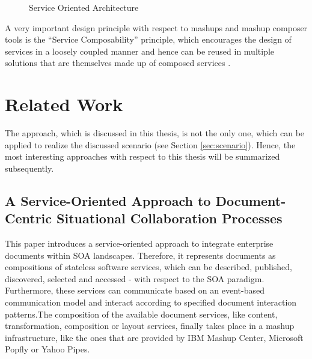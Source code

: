 \begin{figure}
	\centering
	\caption{Service Oriented Architecture}
	\label{fig:soa}
\end{figure}

A very important design principle with respect to mashups and mashup composer tools is the ``Service
Composability'' principle, which encourages the design of services in a loosely coupled manner and
hence can be reused in multiple solutions that are themselves made up of composed services \cite{soa}.

\section{Related Work}

The approach, which is discussed in this thesis, is not the only one, which can be applied to
realize the discussed scenario (see Section \ref{sec:scenario}). Hence, the most interesting
approaches with respect to this thesis will be summarized subsequently.

\subsection{A Service-Oriented Approach to Document-Centric Situational Collaboration Processes}
This paper \cite{schuster2009} introduces a service-oriented approach to integrate enterprise
documents within SOA landscapes. Therefore, it represents documents as compositions of stateless
software services, which can be described, published, discovered, selected and accessed - with
respect to the SOA paradigm. Furthermore, these services can communicate based on an event-based
communication model and interact according to specified document interaction patterns.\newline The
composition of the available document services, like content, transformation, composition or layout
services, finally takes place in a mashup infrastructure, like the ones that are provided by IBM
Mashup Center, Microsoft Popfly or Yahoo Pipes.

